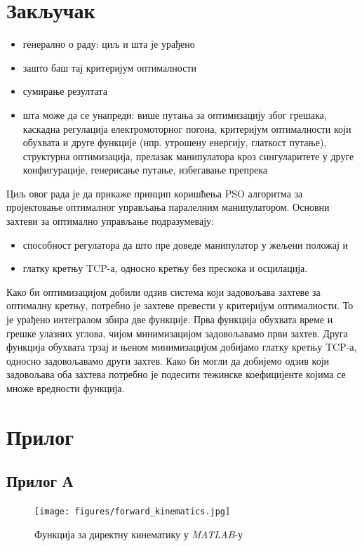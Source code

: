 \documentclass[12pt]{article}
\begin{document}
\section{Закључак}
\begin{itemize}
    \item генерално о раду: циљ и шта је урађено
    \item зашто баш тај критеријум оптималности
    \item сумирање резултата
    \item шта може да се унапреди: више путања за оптимизацију због грешака, каскадна регулација електромоторног погона, критеријум оптималности који обухвата и друге функције (нпр. утрошену енергију, глаткост путање), структурна оптимизација, прелазак манипулатора кроз сингуларитете у друге конфигурације, генерисање путање, избегавање препрека
\end{itemize}

Циљ овог рада је да прикаже принцип коришћења PSO алгоритма за пројектовање оптималног управљања паралелним манипулатором. Основни захтеви за оптимално управљање подразумевају:
\begin{itemize}
    \item способност регулатора да што пре доведе манипулатор у жељени положај и
    \item глатку кретњу TCP-а, односно кретњу без прескока и осцилација.
\end{itemize}

Како би оптимизацијом добили одзив система који задовољава захтеве за оптималну кретњу, потребно је захтеве превести у критеријум оптималности. То је урађено интегралом збира две функције. Прва функција обухвата време и грешке улазних углова, чијом минимизацијом задовољавамо први захтев. Друга функција обухвата трзај и њеном минимизацијом добијамо глатку кретњу TCP-а, односно задовољавамо други захтев. Како би могли да добијемо одзив који задовољава оба захтева потребно је подесити тежинске коефицијенте којима се множе вредности функција.

 



\newpage
\section{Прилог}
\subsection{Прилог А}
\begin{figure}[H]
    \centering
    \texttt{[image: figures/forward\_kinematics.jpg]}
    \caption{Функција за директну кинематику у \textit{MATLAB}-у}
    \label{fig:direktna_kinematika_matlab}
\end{figure}
\end{document}
